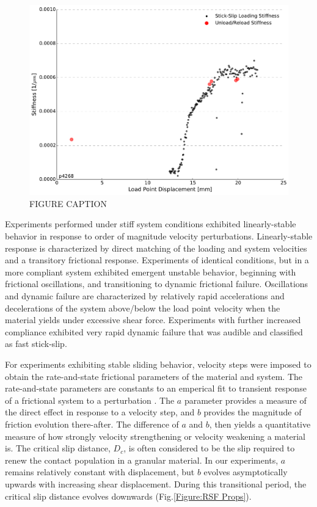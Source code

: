 \documentclass[11pt]{article}
\begin{document}
\begin{figure}
    \centering
        \includegraphics[scale=0.4]{../Figures/Fig_Stiffness_Methods/Stiffness_Methods.pdf}
       \caption{FIGURE CAPTION}
      \label{Figure:Stiffness Methods}
\end{figure}

Experiments performed under stiff system conditions exhibited linearly-stable
behavior in response to order of magnitude velocity perturbations.
Linearly-stable response is characterized by direct matching of the loading and
system velocities and a transitory frictional response. Experiments of identical
conditions, but in a more compliant system exhibited emergent unstable behavior,
beginning with frictional oscillations, and transitioning to dynamic frictional
failure. Oscillations and dynamic failure are characterized by relatively rapid
accelerations and decelerations of the system above/below the load point
velocity when the material yields under excessive shear force. Experiments with
further increased compliance exhibited very rapid dynamic failure that was
audible and classified as fast stick-slip.

For experiments exhibiting stable sliding behavior, velocity steps were imposed
to obtain the rate-and-state frictional parameters of the material and system.
The rate-and-state parameters are constants to an emperical fit to transient
response of a frictional system to a perturbation \cite{Marone:1998}. The $a$
parameter provides a measure of the direct effect in response to a velocity
step, and $b$ provides the magnitude of friction evolution there-after. The
difference of $a$ and $b$, then yields a quantitative measure of how strongly
velocity strengthening or velocity weakening a material is. The critical slip
distance, $D_c$, is often considered to be the slip required to renew the
contact population in a granular material. In our experiments, $a$ remains
relatively constant with displacement, but $b$ evolves asymptotically upwards
with increasing shear displacement. During this transitional period, the
critical slip distance evolves downwards (Fig.\ref{Figure:RSF Props}).
\end{document}
